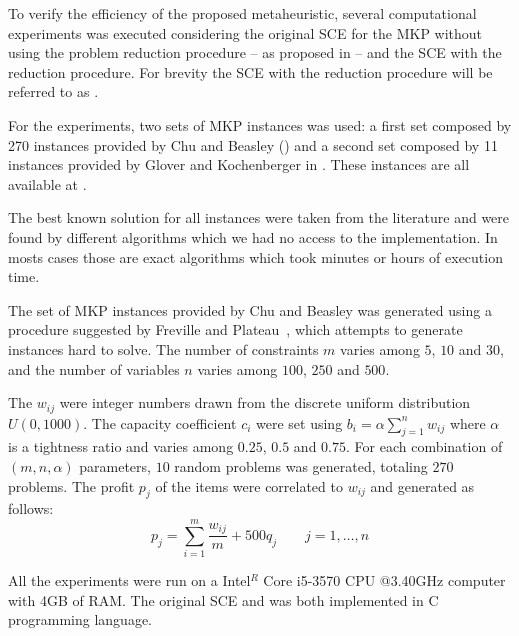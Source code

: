 To verify the efficiency of the proposed metaheuristic, several computational
experiments was executed considering the original SCE for the MKP
without using the problem reduction procedure -- as proposed in \cite{baroni2015shuffled} --
and the SCE with the reduction procedure.
For brevity the SCE with the reduction procedure will be referred to as \scecore.

For the experiments, two sets of MKP instances was used:
a first set composed by 270 instances provided by Chu and Beasley (\cite{Chu-Beasley-1998})
and a second set composed by 11 instances provided by Glover and Kochenberger in
\cite{glover1996critical}.
These instances are all available at \cite{ORLibrary}.

The best known solution for all instances were taken from the literature and
were found by different algorithms which we had no access to the implementation.
In mosts cases those are exact algorithms which took
minutes or hours of execution time.

The set of MKP instances provided by Chu and Beasley was generated using a
procedure suggested by Freville and Plateau~\cite{freville1994efficient}, which
attempts to generate instances hard to solve.
The number of constraints $m$ varies among $5$, $10$ and $30$, and the number
of variables $n$ varies among $100$, $250$ and $500$.

The $w_{ij}$ were integer numbers drawn from the discrete uniform distribution
$U(0, 1000)$.
The capacity coefficient $c_i$ were set using
$b_i = \alpha\sum_{j=1}^{n} w_{ij}$ where $\alpha$ is a tightness ratio and
varies among $0.25$, $0.5$ and $0.75$.
For each combination of $(m,n,\alpha)$ parameters, $10$ random problems was generated,
totaling $270$ problems.
The profit $p_j$ of the items were correlated to $w_{ij}$ and generated as follows:
\begin{equation}
  p_j = \sum_{i=1}^m \frac{w_{ij}}{m} + 500q_j \qquad j = 1, \ldots, n
\end{equation}


All the experiments were run on a Intel$^R$ Core i5-3570 CPU @3.40GHz computer
with 4GB of RAM.
The original SCE and \scecore was both implemented in C programming language.

